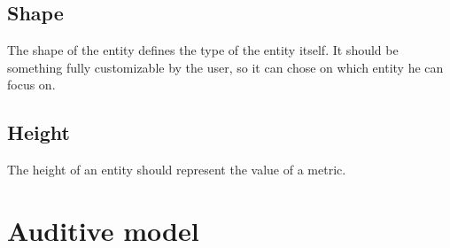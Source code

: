 \subsection*{Shape}
The shape of the entity defines the type of the entity itself. 
It should be something fully customizable by the user, so it can chose on which entity he can focus on. 

\subsection*{Height}
The height of an entity should represent the value of a metric.


\section{Auditive model}
